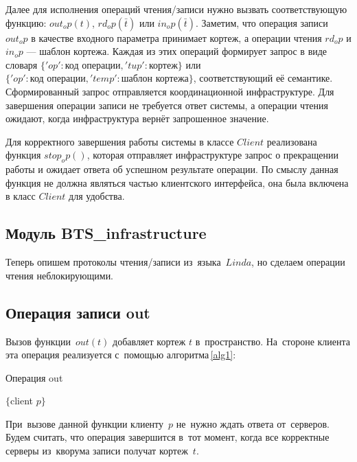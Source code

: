 Далее для исполнения операций чтения/записи нужно вызвать соответствующую функцию: $out_op(t)$, $rd_op(\bar t)$ или $in_op(\bar t)$. Заметим, что операция записи $out_op$ в качестве входного параметра принимает кортеж, а операции чтения $rd_op$ и $in_op$ --- шаблон кортежа. Каждая из этих операций формирует запрос в виде словаря $\{'op': \mbox{код операции}, 'tup': \mbox{кортеж}\}$ или $\{'op': \mbox{код операции}, 'temp': \mbox{шаблон кортежа}\}$, соответствующий её семантике. Сформированный запрос отправляется координационной инфраструктуре. Для завершения операции записи не требуется ответ системы, а операции чтения ожидают, когда инфраструктура вернёт запрошенное значение.

Для корректного завершения работы системы в классе $Client$ реализована функция $stop_op()$, которая отправляет инфраструктуре запрос о прекращении работы и ожидает ответа об успешном результате операции. По смыслу данная функция не должна являться частью клиентского интерфейса, она была включена в класс $Client$ для удобства.

\subsection{Модуль BTS_infrastructure}\label{subsec:4}
 







Теперь опишем протоколы чтения/записи из~языка~$Linda$, но сделаем операции чтения неблокирующими. 

\subsection{Операция записи out}\label{subsec5:1}
Вызов функции~$out(t)$ добавляет кортеж $t$ в~пространство. На~стороне клиента эта операция реализуется с~помощью алгоритма\,\ref{alg1}:

\begin{algorithm}[H]
	\caption{Операция out}\label{alg1}
	\begin{algorithmic}[1]
		\Statex $\{$client $p \}$
			\State {}
		\EndFor
		\EndProcedure
	\end{algorithmic}
\end{algorithm}

При~вызове данной функции клиенту~$p$ не~нужно ждать ответа от~серверов. Будем считать, что операция завершится в~тот момент, когда все корректные серверы из~кворума записи получат кортеж~$t$.

